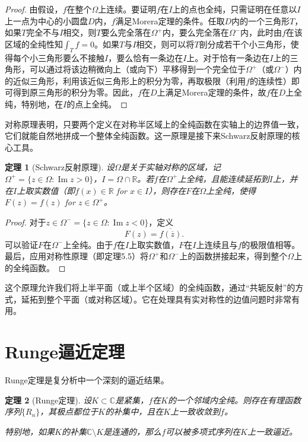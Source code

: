 \documentclass[UTF8]{ctexart}
\newtheorem{theorem}{定理}[section]
\numberwithin{equation}{section}
\newcommand{\RR}{\mathbb{R}}
\newcommand{\CC}{\mathbb{C}}
\begin{document}
\begin{proof}
    由假设，$f$在整个$\Omega$上连续。要证明$f$在$I$上的点也全纯，只需证明在任意以$I$上一点为中心的小圆盘$D$内，$f$满足Morera定理的条件。任取$D$内的一个三角形$T$，如果$T$完全不与$I$相交，则$T$要么完全落在$\Omega^+$内，要么完全落在$\Omega^-$内，此时由$f$在该区域的全纯性知$\int_T f=0$。如果$T$与$I$相交，则可以将$T$剖分成若干个小三角形，使得每个小三角形要么不接触$I$，要么恰有一条边在$I$上。对于恰有一条边在$I$上的三角形，可以通过将该边稍微向上（或向下）平移得到一个完全位于$\Omega^+$（或$\Omega^-$）内的近似三角形，利用该近似三角形上的积分为零，再取极限（利用$f$的连续性）即可得到原三角形的积分为零。因此，$f$在$D$上满足Morera定理的条件，故$f$在$D$上全纯，特别地，在$I$的点上全纯。
\end{proof}

对称原理表明，只要两个定义在对称半区域上的全纯函数在实轴上的边界值一致，它们就能自然地拼成一个整体全纯函数。这一原理是接下来Schwarz反射原理的核心工具。


\begin{theorem}[Schwarz反射原理]
    设$\Omega$是关于实轴对称的区域，记$\Omega^+=\{z\in\Omega:\operatorname{Im}z>0\}$，$I=\Omega\cap\RR$。若$f$在$\Omega^+$上全纯，且能连续延拓到$I$上，并在$I$上取实数值（即$f(x)\in\RR$ for $x\in I$），则存在$F$在$\Omega$上全纯，使得$F(z)=f(z)$ for $z\in\Omega^+$。
\end{theorem}

\begin{proof}
    对于$z\in\Omega^-=\{z\in\Omega:\operatorname{Im}z<0\}$，定义
    \[
    F(z) = \overline{f(\overline{z})}.
    \]
    可以验证$F$在$\Omega^-$上全纯。由于$f$在$I$上取实数值，$F$在$I$上连续且与$f$的极限值相等。最后，应用对称性原理（即定理5.5）将$\Omega^+$和$\Omega^-$上的函数拼接起来，得到整个$\Omega$上的全纯函数。
\end{proof}

这个原理允许我们将上半平面（或上半个区域）的全纯函数，通过“共轭反射”的方式，延拓到整个平面（或对称区域）。它在处理具有实对称性的边值问题时非常有用。

\section{Runge逼近定理}

Runge定理是复分析中一个深刻的逼近结果。

\begin{theorem}[Runge定理]
    设$K\subset\CC$是紧集，$f$在$K$的一个邻域内全纯。则存在有理函数序列$\{R_n\}$，其极点都位于$K$的补集中，且在$K$上一致收敛到$f$。
    
    特别地，如果$K$的补集$\CC\setminus K$是连通的，那么$f$可以被多项式序列在$K$上一致逼近。
\end{theorem}
\end{document}
